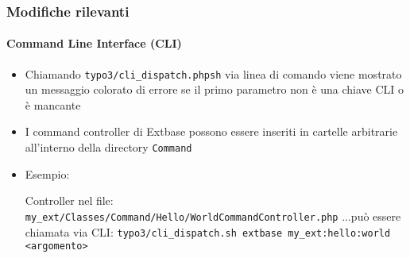 \begin{frame}[fragile]
	\frametitle{Modifiche rilevanti}
	\framesubtitle{Command Line Interface (CLI)}

	\lstset{basicstyle=\tiny\ttfamily}

	\begin{itemize}

		\item Chiamando \texttt{typo3/cli\_dispatch.phpsh} via linea di comando viene mostrato un
			messaggio colorato di errore se il primo parametro non è una chiave CLI o è mancante

		\item I command controller di Extbase possono essere inseriti in cartelle arbitrarie all'interno della directory
			\texttt{Command} 

		\item Esempio:\newline

			Controller nel file:\newline
			\smaller\texttt{my\_ext/Classes/Command/Hello/WorldCommandController.php}\normalsize\newline
			...può essere chiamata via CLI:\newline
			\smaller\texttt{typo3/cli\_dispatch.sh extbase my\_ext:hello:world <argomento>}\normalsize

	\end{itemize}

\end{frame}


